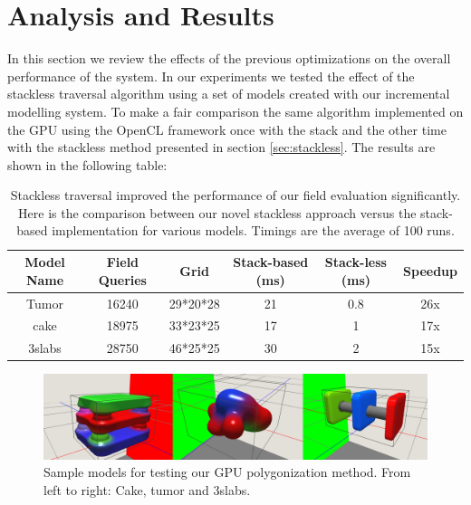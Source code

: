 \section{Analysis and Results}
In this section we review the effects of the previous optimizations on the overall performance of the system.
In our experiments we tested the effect of the stackless \blob traversal algorithm using a set of models created 
with our incremental modelling system. To make a fair comparison the same algorithm implemented on the GPU using
the OpenCL framework once with the stack and the other time with the stackless method presented in section 
\ref{sec:stackless}. The results are shown in the following table:



\begin{table}[H]
\begin{center}
	 \caption{\label{table:stackless}
  {Stackless \blob traversal improved the performance of our \blob field evaluation significantly.
  Here is the comparison between our novel stackless approach versus the stack-based implementation for various models. 
  Timings are the average of 100 runs.}
}
  \begin{tabular}{ | c | c | c | c | c | c |}
    \hline    
    Model Name & Field Queries & Grid & Stack-based (ms) & Stack-less (ms) & Speedup \\ \hline \hline
    Tumor & 16240 & 29*20*28 & 21 & 0.8 & 26x\\ \hline
    cake & 18975 & 33*23*25 & 17 & 1 & 17x\\ \hline
    3slabs & 28750 & 46*25*25 & 30 & 2 & 15x \\ \hline
    \hline
  \end{tabular}
\end{center}
\end{table}


\begin{figure}[H]
  \centering
  \includegraphics[width=1.0\linewidth]{figures/gpupoly/combined_models.png}
  \caption{\label{fig:combinedmodels}
  {Sample models for testing our GPU polygonization method. From left to right: Cake, tumor and 3slabs.}
}
\end{figure}

